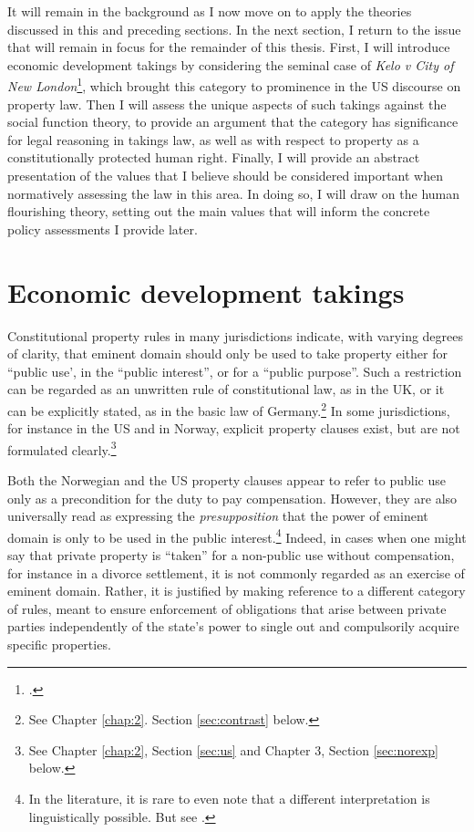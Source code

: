 \documentclass[12pt,a4paper]{book} %
\begin{document}
It will remain in the background as I now move on to apply the theories discussed in this and preceding sections. In the next section,  I return to the issue that will remain in focus for the remainder of this thesis. First, I will introduce economic development takings by considering the seminal case of {\it Kelo v City of New London}\footcite{kelo05}, which brought this category to prominence in the US discourse on property law. Then I will assess the unique aspects of such takings against the social function theory, to provide an argument that the category has significance for legal reasoning in takings law, as well as with respect to property as a constitutionally protected human right. Finally, I will provide an abstract presentation of the values that I believe should be considered important when normatively assessing the law in this area. In doing so, I will draw on the human flourishing theory, setting out the main values that will inform the concrete policy assessments I provide later. 

\section{Economic development takings}\label{sec:edt}

Constitutional property rules in many jurisdictions indicate, with varying degrees of clarity, that eminent domain should only be used to take property either for ``public use', in the ``public interest'', or for a ``public purpose''. Such a restriction can be regarded as an unwritten rule of constitutional law, as in the UK, or it can be explicitly stated, as in the basic law of Germany.\footnote{See Chapter \ref{chap:2}. Section \ref{sec:contrast} below.} In some jurisdictions, for instance in the US and in Norway, explicit property clauses exist, but are not formulated clearly.\footnote{See Chapter \ref{chap:2}, Section \ref{sec:us} and Chapter 3, Section \ref{sec:norexp} below.}

Both the Norwegian and the US property clauses appear to refer to public use only as a precondition for the duty to pay compensation. However, they are also universally read as expressing the {\it presupposition} that the power of eminent domain is only to be used in the public interest.\footnote{In the literature, it is rare to even note that a different interpretation is linguistically possible. But see \cite[205]{berger78}.} Indeed, in cases when one might say that private property is ``taken'' for a non-public use without compensation, for instance in a divorce settlement, it is not commonly regarded as an exercise of eminent domain. Rather, it is justified by making reference to a different category of rules, meant to ensure enforcement of obligations that arise between private parties independently of the state's power to single out and compulsorily acquire specific properties.
\end{document}
